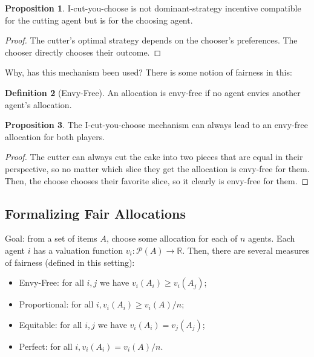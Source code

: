 \documentclass[dvipsnames]{article}
\theoremstyle{definition}
\newtheorem{definition}{Definition}[section]
\newtheorem{proposition}[definition]{Proposition}
\theoremstyle{remark}
\begin{document}
\begin{proposition}
	I-cut-you-choose is not dominant-strategy incentive compatible for the cutting agent but is for the choosing agent.
\end{proposition}

\begin{proof}
	The cutter's optimal strategy depends on the chooser's preferences. The chooser directly chooses their outcome.
\end{proof}
 
 Why, has this mechanism been used? There is some notion of fairness in this:
 
 \begin{definition}[Envy-Free]
 	An allocation is envy-free if no agent envies another agent's allocation.
 \end{definition}

\begin{proposition}
	The I-cut-you-choose mechanism can always lead to an envy-free allocation for both players.
\end{proposition}

\begin{proof}
	The cutter can always cut the cake into two pieces that are equal in their perspective, so no matter which slice they get the allocation is envy-free for them. Then, the choose chooses their favorite slice, so it clearly is envy-free for them.
\end{proof}

\subsection{Formalizing Fair Allocations}

Goal: from a set of items $A$, choose some allocation for each of $n$ agents. Each agent $i$ has a valuation function $v_i: \mathcal{P}(A) \to \mathbb{R}$. Then, there are several measures of fairness (defined in this setting):

\begin{itemize}
	\item Envy-Free: for all $i,j$ we have $v_i(A_i) \geq v_i(A_j)$;
	\item Proportional: for all $i, v_i(A_i) \geq v_i(A)/n$;
	\item Equitable: for all $i,j$ we have $v_i(A_i) = v_j(A_j)$;
	\item Perfect: for all $i, v_i(A_i) = v_i(A)/n$.
\end{itemize}
\end{document}
